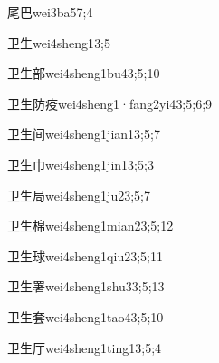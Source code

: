 \begin{verbete}{尾巴}{wei3ba5}{7;4}
\end{verbete}

\begin{verbete}{卫生}{wei4sheng1}{3;5}
\end{verbete}

\begin{verbete}{卫生部}{wei4sheng1bu4}{3;5;10}
\end{verbete}

\begin{verbete}{卫生防疫}{wei4sheng1·fang2yi4}{3;5;6;9}
\end{verbete}

\begin{verbete}{卫生间}{wei4sheng1jian1}{3;5;7}
\end{verbete}

\begin{verbete}{卫生巾}{wei4sheng1jin1}{3;5;3}
\end{verbete}

\begin{verbete}{卫生局}{wei4sheng1ju2}{3;5;7}
\end{verbete}

\begin{verbete}{卫生棉}{wei4sheng1mian2}{3;5;12}
\end{verbete}

\begin{verbete}{卫生球}{wei4sheng1qiu2}{3;5;11}
\end{verbete}

\begin{verbete}{卫生署}{wei4sheng1shu3}{3;5;13}
\end{verbete}

\begin{verbete}{卫生套}{wei4sheng1tao4}{3;5;10}
\end{verbete}

\begin{verbete}{卫生厅}{wei4sheng1ting1}{3;5;4}
\end{verbete}

